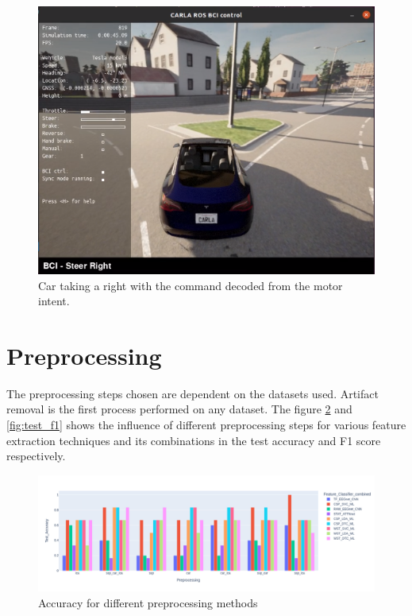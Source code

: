      \begin{figure}[H]
        \begin{center}
        \includegraphics[width=1.0\textwidth]{images/carla_right1.png}
        \caption{Car taking a right with the command decoded from the motor intent.}
        \label{fig:carla_right}
        \end{center}
    \end{figure}
    
\section{Preprocessing}
 The preprocessing steps chosen are dependent on the datasets used. Artifact removal is the first process performed on any dataset. The figure \ref{fig:test_acc} and \ref{fig:test_f1} shows the influence of different preprocessing steps for various feature extraction techniques and its combinations in the test accuracy and F1 score respectively. 

     \begin{figure}[H]
        \begin{center}
        \includegraphics[width=1.0\textwidth]{images/preproc_test_acc_feat_bar.png}
        \caption{Accuracy for different preprocessing methods}
        \label{fig:test_acc}
        \end{center}
    \end{figure}


